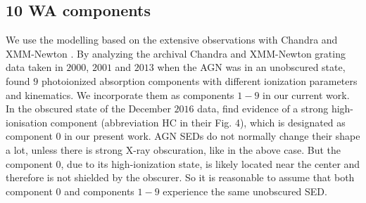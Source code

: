 \documentclass{aa}
\begin{document}
\subsection{10 WA components }\label{subsect:WA 10 componets prototype}


We use the modelling based on the extensive observations with Chandra and XMM-Newton \citep{Mehdipour2017A&A}.
By analyzing the archival Chandra and XMM-Newton grating data taken in $2000$, $2001$ and $2013$ when the AGN was in an unobscured state, \cite{Mao2019A&A} found $9$ photoionized absorption components with different ionization parameters and kinematics. 
We incorporate them as components $1-9$ in our current work.
In the obscured state of the December $2016$ data, \cite{Mehdipour2017A&A} find evidence of a strong high-ionisation component (abbreviation HC in their Fig. 4), which is designated as component $0$ in our present work. 
AGN SEDs do not normally change their shape a lot, unless there is strong X-ray obscuration, like in the above case. 
But the component $0$, due to its high-ionization state, is likely located near the center and therefore is not shielded by the obscurer. 
So it is reasonable to assume that both component $0$ and components $1-9$ experience the same unobscured SED.
\end{document}

